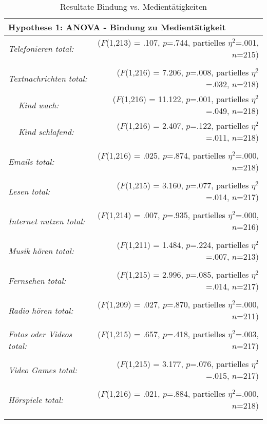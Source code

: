 \begin{table}[ht]
\begin{tabular}{l l  r }

  \multicolumn{3}{l}{\textbf{Hypothese 1:} ANOVA - Bindung zu Medientätigkeit}\\
  \hline
  \multicolumn{2}{l}{\textit{Telefonieren total:}} & ($F$(1,213) = .107, $p$=.744, partielles $\eta^2$=.001, $n$=215)\\
  &&\\
  \multicolumn{2}{l}{\textit{Textnachrichten total:}} & ($F$(1,216) = 7.206, $p$=.008, partielles $\eta^2$=.032, $n$=218)\\
  & \textit{Kind wach:} & ($F$(1,216) = 11.122, $p$=.001, partielles $\eta^2$=.049, $n$=218)\\
  & \textit{Kind schlafend:} & ($F$(1,216) = 2.407, $p$=.122, partielles $\eta^2$=.011, $n$=218)\\
  &&\\
  \multicolumn{2}{l}{\textit{Emails total:}} & ($F$(1,216) = .025, $p$=.874, partielles $\eta^2$=.000, $n$=218)\\
  &&\\
  \multicolumn{2}{l}{\textit{Lesen total:}} & ($F$(1,215) = 3.160, $p$=.077, partielles $\eta^2$=.014, $n$=217)\\
  &&\\
  \multicolumn{2}{l}{\textit{Internet nutzen total:}} & ($F$(1,214) = .007, $p$=.935, partielles $\eta^2$=.000, $n$=216)\\
  &&\\
  \multicolumn{2}{l}{\textit{Musik hören total:}} & ($F$(1,211) = 1.484, $p$=.224, partielles $\eta^2$=.007, $n$=213)\\
  &&\\
  \multicolumn{2}{l}{\textit{Fernsehen total: }} & ($F$(1,215) = 2.996, $p$=.085, partielles $\eta^2$=.014, $n$=217)\\
  &&\\
  \multicolumn{2}{l}{\textit{Radio hören total:}} & ($F$(1,209) = .027, $p$=.870, partielles $\eta^2$=.000, $n$=211)\\
  &&\\
  \multicolumn{2}{l}{\textit{Fotos oder Videos total: }} & ($F$(1,215) = .657, $p$=.418, partielles $\eta^2$=.003, $n$=217)\\
  &&\\
  \multicolumn{2}{l}{\textit{Video Games total:}} & ($F$(1,215) = 3.177, $p$=.076, partielles $\eta^2$=.015, $n$=217)\\
  &&\\
  \multicolumn{2}{l}{\textit{Hörspiele total:}} & ($F$(1,216) = .021, $p$=.884, partielles $\eta^2$=.000, $n$=218)\\
  &&\\
  
  &&\\
\end{tabular}
\caption{Resultate Bindung vs. Medientätigkeiten}
\label{table:AppResultateMedientaetigkeiten}
\end{table}
